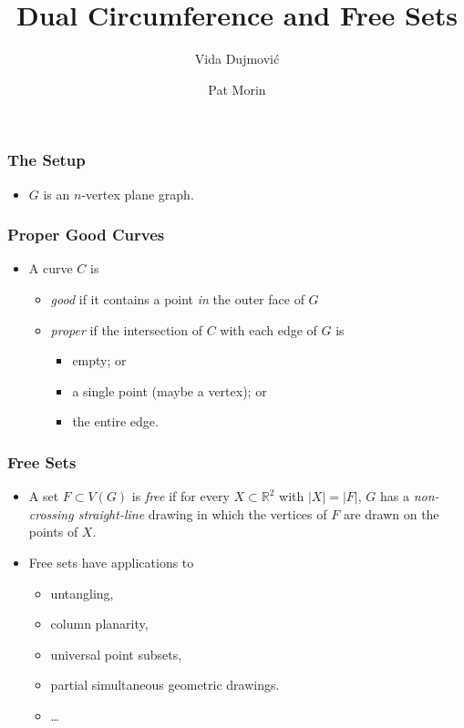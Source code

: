 \documentclass[xcolor=dvipsnames]{beamer}
\title{Dual Circumference and Free Sets}
\author{Vida Dujmović \and Pat Morin}
\newcommand{\R}{\mathbb{R}}
\begin{document}
\begin{frame}
  \titlepage
\end{frame}

\begin{frame}
   \frametitle{The Setup}

   \begin{itemize}
      \item $G$ is an $n$-vertex plane graph.
   \end{itemize}
\end{frame}

\begin{frame}
  \frametitle{Proper Good Curves}
  
  \begin{itemize}
     \item A curve $C$ is 
     \begin{itemize}
        \item \emph{good} if it contains a point \emph{in} the outer face of $G$
        \item \emph{proper} if the intersection of $C$ with each edge of $G$ is
         \begin{itemize}
            \item empty; or
            \item a single point (maybe a vertex); or
            \item the entire edge.
         \end{itemize}
     \end{itemize}
  \end{itemize}
\end{frame}

\begin{frame}
  \frametitle{Free Sets}

   \begin{itemize}
     \item A set $F\subset V(G)$ is \emph{free} if for every
     $X\subset\R^2$ with $|X|=|F|$, $G$ has a \emph{non-crossing
     straight-line} drawing in which the vertices of $F$ are drawn on
     the points of $X$.

     \item Free sets have applications to
     \begin{itemize}
        \item untangling, 
        \item column planarity, 
        \item universal point subsets, 
        \item partial simultaneous geometric drawings.
        \item \ldots
     \end{itemize}
   \end{itemize}
\end{frame}
\end{document}
